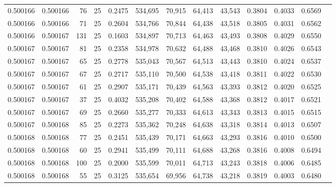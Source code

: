 \begin{tabular}{rrrrrrrrrrrrr}
0.500166 & 0.500166 &    76 &  25 &                                     0.2475 & 534,695 &  70,915 &  64,413 &  43,543 & 0.3804 & 0.4033 & 0.6569 \\
0.500166 & 0.500166 &    71 &  25 &                                     0.2604 & 534,766 &  70,844 &  64,438 &  43,518 & 0.3805 & 0.4031 & 0.6562 \\
0.500166 & 0.500167 &   131 &  25 &                                     0.1603 & 534,897 &  70,713 &  64,463 &  43,493 & 0.3808 & 0.4029 & 0.6550 \\
0.500167 & 0.500167 &    81 &  25 &                                     0.2358 & 534,978 &  70,632 &  64,488 &  43,468 & 0.3810 & 0.4026 & 0.6543 \\
0.500167 & 0.500167 &    65 &  25 &                                     0.2778 & 535,043 &  70,567 &  64,513 &  43,443 & 0.3810 & 0.4024 & 0.6537 \\
0.500167 & 0.500167 &    67 &  25 &                                     0.2717 & 535,110 &  70,500 &  64,538 &  43,418 & 0.3811 & 0.4022 & 0.6530 \\
0.500167 & 0.500167 &    61 &  25 &                                     0.2907 & 535,171 &  70,439 &  64,563 &  43,393 & 0.3812 & 0.4020 & 0.6525 \\
0.500167 & 0.500167 &    37 &  25 &                                     0.4032 & 535,208 &  70,402 &  64,588 &  43,368 & 0.3812 & 0.4017 & 0.6521 \\
0.500167 & 0.500167 &    69 &  25 &                                     0.2660 & 535,277 &  70,333 &  64,613 &  43,343 & 0.3813 & 0.4015 & 0.6515 \\
0.500167 & 0.500168 &    85 &  25 &                                     0.2273 & 535,362 &  70,248 &  64,638 &  43,318 & 0.3814 & 0.4013 & 0.6507 \\
0.500168 & 0.500168 &    77 &  25 &                                     0.2451 & 535,439 &  70,171 &  64,663 &  43,293 & 0.3816 & 0.4010 & 0.6500 \\
0.500168 & 0.500168 &    60 &  25 &                                     0.2941 & 535,499 &  70,111 &  64,688 &  43,268 & 0.3816 & 0.4008 & 0.6494 \\
0.500168 & 0.500168 &   100 &  25 &                                     0.2000 & 535,599 &  70,011 &  64,713 &  43,243 & 0.3818 & 0.4006 & 0.6485 \\
0.500168 & 0.500168 &    55 &  25 &                                     0.3125 & 535,654 &  69,956 &  64,738 &  43,218 & 0.3819 & 0.4003 & 0.6480 \\

\end{tabular}

